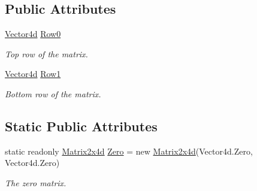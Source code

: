 \subsection*{Public Attributes}
\begin{DoxyCompactItemize}
\item 
\hyperlink{struct_open_t_k_1_1_vector4d}{Vector4d} \hyperlink{struct_open_t_k_1_1_matrix2x4d_a2003dc9b0f0478fc9ef05008fc493e23}{Row0}
\begin{DoxyCompactList}\small\item\em Top row of the matrix. \end{DoxyCompactList}\item 
\hyperlink{struct_open_t_k_1_1_vector4d}{Vector4d} \hyperlink{struct_open_t_k_1_1_matrix2x4d_ac9a7b75a51ad79898e2464d21785e0d3}{Row1}
\begin{DoxyCompactList}\small\item\em Bottom row of the matrix. \end{DoxyCompactList}\end{DoxyCompactItemize}
\subsection*{Static Public Attributes}
\begin{DoxyCompactItemize}
\item 
static readonly \hyperlink{struct_open_t_k_1_1_matrix2x4d}{Matrix2x4d} \hyperlink{struct_open_t_k_1_1_matrix2x4d_a5abb66a4114192a92a00cffceec3ebe5}{Zero} = new \hyperlink{struct_open_t_k_1_1_matrix2x4d}{Matrix2x4d}(Vector4d.\-Zero, Vector4d.\-Zero)
\begin{DoxyCompactList}\small\item\em The zero matrix. \end{DoxyCompactList}\end{DoxyCompactItemize}

